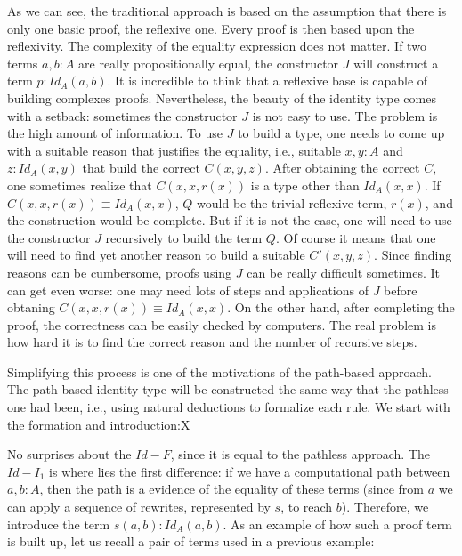 \documentclass{entcs} \usepackage{entcsmacro}
\begin{document}
As we can see, the traditional approach is based on the assumption that there is only one basic proof, the reflexive one. Every proof is then based upon the reflexivity. The complexity of the equality expression does not matter. If two terms $a,b : A$ are really propositionally equal, the constructor $J$ will construct a term $p : Id_{A}(a,b)$. It is incredible to think that a reflexive base is capable of building complexes proofs. Nevertheless, the beauty of the identity type comes with a setback: sometimes the constructor $J$ is not easy to use. The problem is the high amount of information. To use $J$ to build a type, one needs to come up with a suitable reason that justifies the equality, i.e., suitable $x, y : A$ and $z : Id_{A}(x,y)$ that build the correct $C(x,y,z)$. After obtaining the correct $C$, one sometimes realize that $C(x,x,r(x))$ is a type other than $Id_{A}(x,x)$. If $C(x,x,r(x)) \equiv Id_{A}(x,x)$, $Q$ would be the trivial reflexive term, $r(x)$, and the construction would be complete. But if it is not the case, one will need to use the constructor $J$ recursively to build the term $Q$. Of course it means that one will need to find yet another reason to build a suitable $C'(x,y,z)$. Since finding reasons can be cumbersome, proofs using $J$ can be really difficult sometimes. It can get even worse: one may need lots of steps and applications of $J$ before obtaning $C(x,x,r(x)) \equiv Id_{A}(x,x)$. On the other hand, after completing the proof, the correctness can be easily checked by computers. The real problem is how hard it is to find the correct reason and the number of recursive steps.

Simplifying this process is one of the motivations of the path-based approach. The path-based identity type will be constructed the same way that the pathless one had been, i.e., using natural deductions to formalize each rule. We start with the formation and introduction:X

\bigskip
\begin{center}
\begin{bprooftree}
\end{bprooftree}
\begin{bprooftree}
\end{bprooftree}
\end{center}
\bigskip

No surprises about the $Id - F$, since it is equal to the pathless approach. The $Id-I_{1}$ is where lies the first difference: if we have a computational path between $a,b : A$, then the path is a evidence of the equality of these terms (since from $a$ we can apply a sequence of rewrites, represented by $s$, to reach $b$). Therefore, we introduce the term $s(a,b) : Id_{A}(a,b)$. As an example of how such a proof term is built up, let us recall a pair of terms used in a previous example:
\end{document}
